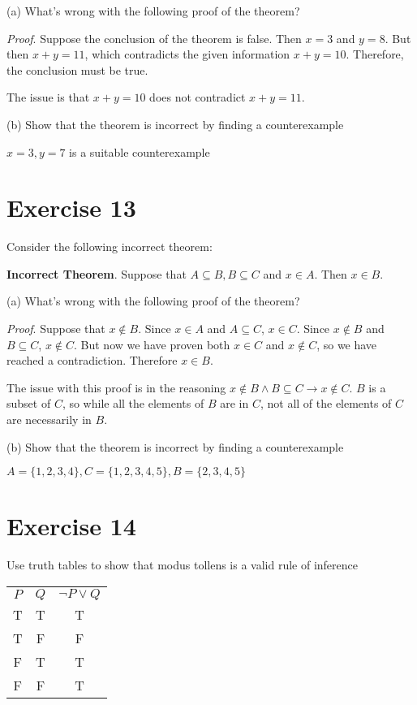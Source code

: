 \documentclass[11pt]{article}
\newcommand{\then}{\rightarrow}
\begin{document}
\noindent (a) What's wrong with the following proof of the
theorem?

\textit{Proof}. Suppose the conclusion of the theorem is false. Then $x = 3$ 
and $y = 8$. But then $x + y = 11$, which contradicts the given information 
$x + y = 10$. Therefore, the conclusion must be true.

The issue is that $x + y = 10$ does not contradict $x + y = 11$.

\noindent (b) Show that the theorem is incorrect by finding a counterexample

$x = 3, y = 7$ is a suitable counterexample

\section*{Exercise 13}

Consider the following incorrect theorem:

\textbf{Incorrect Theorem}. Suppose that $A \subseteq B, B \subseteq C$ and
$x \in A$. Then $x \in B$.

\noindent (a) What's wrong with the following proof of the theorem?

\textit{Proof}. Suppose that $x \notin B$. Since $x \in A$ and $A \subseteq C$,
$x \in C$. Since $x \notin B$ and $B \subseteq C$, $x \notin C$. But now we have 
proven both $x \in C$ and $x \notin C$, so we have reached a contradiction.
Therefore $x \in B$.

The issue with this proof is in the reasoning 
$x \notin B \wedge B \subseteq C \then x \notin C$. $B$ is a subset of $C$, so 
while all the elements of $B$ are in $C$, not all of the elements of $C$ are 
necessarily in $B$.

\noindent (b) Show that the theorem is incorrect by finding a counterexample

$A = \{1,2,3,4\}, C=\{1,2,3,4,5\}, B=\{2,3,4,5\}$

\section*{Exercise 14}

Use truth tables to show that modus tollens is a valid rule of inference 

\begin{center}
    \begin{tabular}{ c c c  }
     $P$ & $Q$ & $\neg P \vee Q$\\ 
    T & T & T\\  
    T & F & F\\
    F & T & T\\  
    F & F & T
    \end{tabular}
\end{center}
\end{document}
